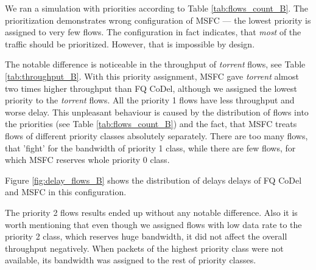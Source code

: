 

We ran a simulation with priorities according to Table \ref{tab:flows_count_B}. The prioritization demonstrates wrong configuration of MSFC --- the lowest priority is assigned to very few flows. The configuration in fact indicates, that \emph{most} of the traffic should be prioritized. However, that is impossible by design.

The notable difference is noticeable in the throughput of \emph{torrent} flows, see Table \ref{tab:throughput_B}. With this priority assignment, MSFC gave \emph{torrent} almost two times higher throughput than FQ CoDel, although we assigned the lowest priority to the \emph{torrent} flows. All the priority 1 flows have less throughput and worse delay. This unpleasant behaviour is caused by the distribution of flows into the priorities (see Table \ref{tab:flows_count_B}) and the fact, that MSFC treats flows of different priority classes absolutely separately. There are too many flows, that 'fight' for the bandwidth of priority 1 class, while there are few flows, for which MSFC reserves whole priority 0 class.

Figure \ref{fig:delay_flows_B} shows the distribution of delays delays of FQ CoDel and MSFC in this configuration.

The priority 2 flows results ended up without any notable difference. Also it is worth mentioning that even though we assigned flows with low data rate to the priority 2 class, which reserves huge bandwidth, it did not affect the overall throughput negatively. When packets of the highest priority class were not available, its bandwidth was assigned to the rest of priority classes.





